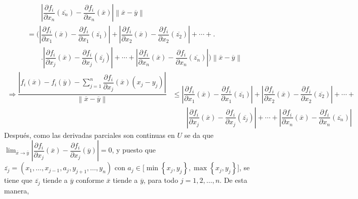 \documentclass[fleqn]{article}
\begin{document}
\begin{equation*}
\begin{split}
			& \qquad \left\lvert \dfrac{\partial f_i}{\partial x_n} (\overline{z_n}) - \dfrac{\partial f_i}{\partial x_n} (\overline{x}) \right\rvert \left\lVert \overline{x} - \overline{y} \right\rVert \\
			&= \Biggl( \left\lvert \dfrac{\partial f_i}{\partial x_1} (\overline{x}) - \dfrac{\partial f_i}{\partial x_1} (\overline{z_1}) \right\rvert + \left\lvert \dfrac{\partial f_i}{\partial x_2} (\overline{x}) - \dfrac{\partial f_i}{\partial x_2} (\overline{z_2}) \right\rvert + \cdots + \Biggr. \\
			& \qquad \Biggl. \left\lvert \dfrac{\partial f_i}{\partial x_j} (\overline{x}) - \dfrac{\partial f_i}{\partial x_j} (\overline{z_j}) \right\rvert + \cdots + \left\lvert \dfrac{\partial f_i}{\partial x_n} (\overline{x}) - \dfrac{\partial f_i}{\partial x_n} (\overline{z_n}) \right\rvert \Biggr) \left\lVert \overline{x} - \overline{y} \right\rVert
		\end{split}
	\end{equation*}
	\begin{equation*}
		\begin{split}
			\Longrightarrow \dfrac{\left\lvert f_i(\overline{x}) - f_i(\overline{y}) - \displaystyle \sum_{j=1}^{n} \dfrac{\partial f_i}{\partial x_j}(\overline{x}) \left( x_j - y_j \right) \right\rvert}{\left\lVert \overline{x} - \overline{y} \right\rVert} &\leq \left\lvert \dfrac{\partial f_i}{\partial x_1} (\overline{x}) - \dfrac{\partial f_i}{\partial x_1} (\overline{z_1}) \right\rvert + \left\lvert \dfrac{\partial f_i}{\partial x_2} (\overline{x}) - \dfrac{\partial f_i}{\partial x_2} (\overline{z_2}) \right\rvert + \cdots + \\
			& \qquad \left\lvert \dfrac{\partial f_i}{\partial x_j} (\overline{x}) - \dfrac{\partial f_i}{\partial x_j} (\overline{z_j}) \right\rvert + \cdots + \left\lvert \dfrac{\partial f_i}{\partial x_n} (\overline{x}) - \dfrac{\partial f_i}{\partial x_n} (\overline{z_n}) \right\rvert
		\end{split}
	\end{equation*}
	Después, como las derivadas parciales son continuas en $ U $ se da que $ \displaystyle \lim_{\overline{x} \to \overline{y}} \left\lvert \dfrac{\partial f_i}{\partial x_j} (\overline{x}) - \dfrac{\partial f_i}{\partial x_j} (\overline{y}) \right\rvert = 0 $, y puesto que $ \overline{z_j} = (x_1, \ldots, x_{j-1}, a_j, y_{j+1}, \ldots, y_n) $ con $ a_j \in \bigl[ \min \left\lbrace x_j, y_j \right\rbrace, \max \left\lbrace x_j, y_j \right\rbrace \bigr] $, se tiene que $ \overline{z_j} $ tiende a $ \overline{y} $ conforme $ \overline{x} $ tiende a $ \overline{y} $, para todo $ j = 1, 2, \ldots, n $. De esta manera, 
\end{document}
